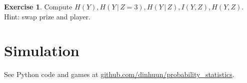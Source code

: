 \documentclass[11pt]{amsart}
\theoremstyle{definition}
\newtheorem{exercise}[theorem]{Exercise}
\begin{document}
\begin{exercise}\label{} Compute $H(Y), H(Y \,|\, Z = 3), H(Y \,|\, Z), I(Y, Z), H(Y, Z)$. Hint: swap prize and player.
\end{exercise}
\section{Simulation} See Python code and games at \href{https://github.com/dinhuun/probability_statistics}{github.com/dinhuun/probability\_statistics}.
\end{document}
